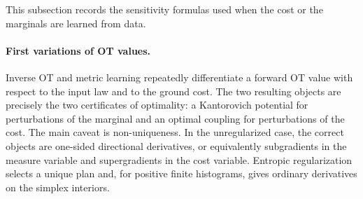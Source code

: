 This subsection records the sensitivity formulas used when the cost or the marginals are learned from data.

\paragraph{First variations of OT values.}
Inverse OT and metric learning repeatedly differentiate a forward OT value with respect to the input law and to the ground cost. The two resulting objects are precisely the two certificates of optimality: a Kantorovich potential for perturbations of the marginal and an optimal coupling for perturbations of the cost. The main caveat is non-uniqueness. In the unregularized case, the correct objects are one-sided directional derivatives, or equivalently subgradients in the measure variable and supergradients in the cost variable. Entropic regularization selects a unique plan and, for positive finite histograms, gives ordinary derivatives on the simplex interiors.

